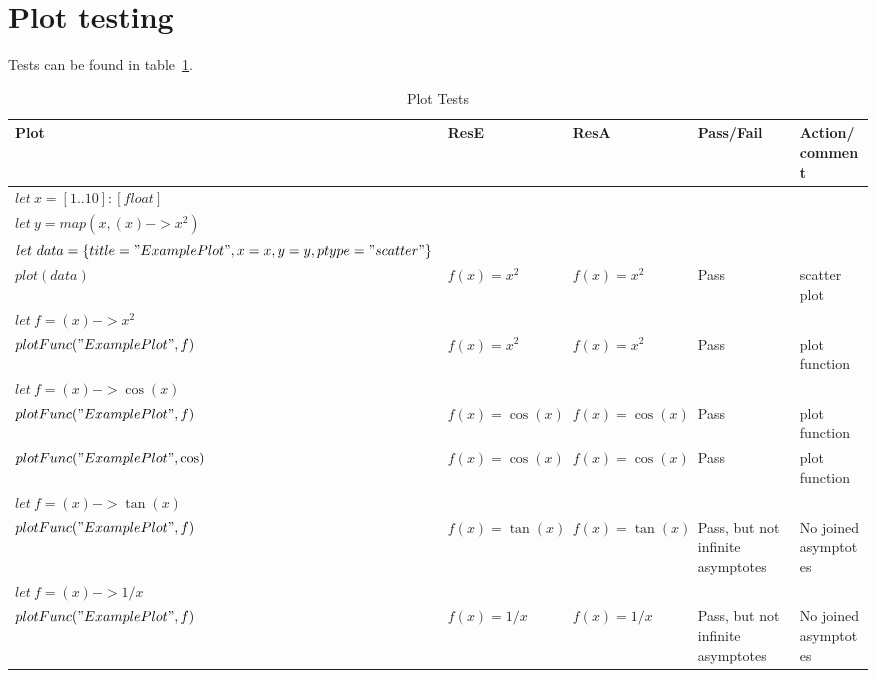 \section{Plot testing}\label{sec:plot-testing}

Tests can be found in table~\ref{tab:plot-tests}.

\begin{table}[h]
    \caption{Plot Tests}
\begin{tabular}{|p{1.8in}|p{0.5in}|p{0.4in}|p{0.6in}|p{1.4in}|} \hline
Plot & ResE & ResA& Pass/Fail & Action/comment \\ \hline \hline
$let\ x = [1..10] : [float]$ & & & & \\
$let\ y = map(x, (x) -> x^2)$ & & & & \\
$let\ data = \{ title = "Example Plot", x = x, y = y, ptype = "scatter" \}$ & & & & \\
$plot(data)$ & $f(x) = x^2$ & $f(x) = x^2$ & Pass & scatter plot \\ \hline
$let\ f = (x) -> x^2$ & & & & \\
$plotFunc("Example Plot", f)$ & $f(x) = x^2$ & $f(x) = x^2$ & Pass & plot function \\ \hline
$let\ f = (x) -> \cos(x)$ & & & & \\
$plotFunc("Example Plot", f)$ & $f(x) = \cos(x)$ & $f(x) = \cos(x)$ & Pass & plot function \\ \hline
$plotFunc("Example Plot", \cos)$ & $f(x) = \cos(x)$ & $f(x) = \cos(x)$ & Pass & plot function \\ \hline
$let\ f = (x) -> \tan(x)$ & & & & \\
$plotFunc("Example Plot", f)$ & $f(x) = \tan(x)$ & $f(x) = \tan(x)$ & Pass, but not infinite asymptotes & No joined asymptotes \\ \hline
$let\ f = (x) -> 1 / x$ & & & & \\
$plotFunc("Example Plot", f)$ & $f(x) = 1/x$ & $f(x) = 1/x$ & Pass, but not infinite asymptotes & No joined asymptotes \\ \hline
\end{tabular}
\label{tab:plot-tests}
\end{table}
